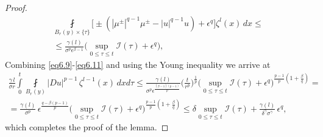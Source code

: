\documentclass[10pt,a4paper]{amsart}
\begin{document}
\begin{proof}
\begin{multline}
\fint\limits_{B_{r}(y)\times\{\tau\}}\big[\pm(|\mu^{\pm}|^{q-1}\mu^{\pm}-|u|^{q-1}u)+\epsilon^q\big]\zeta^l(x)\,dx\leqslant\\\leqslant \frac{\gamma(l)}{\sigma^p \epsilon^{\beta-1}}\big(\sup\limits_{0\leqslant \tau\leqslant t}\mathcal{I}(\tau) +\epsilon^q\big),
\end{multline}
Combining \eqref{eq6.9}-\eqref{eq6.11} and using the Young inequality we arrive at
\begin{multline*}
\frac{\gamma\,l}{\sigma r}\int\limits^t_0\fint\limits_{B_{ r}(y)}|D u|^{p-1}\,\zeta^{l-1}(x)\,dx d\tau\leqslant
\frac{\gamma(l)}{\sigma^p \epsilon^{\frac{(\beta-1)(p-1)}{p}}}\Big(\frac{t}{r^p}\Big)^{\frac{1}{p}}\Big(
\sup\limits_{0\leqslant \tau\leqslant t}\mathcal{I}(\tau)+
\epsilon^q\Big)^{\frac{p-1}{p}(1+\frac{\beta}{q})}=\\=
\frac{\gamma(l)}{\sigma^p}\,\epsilon^{\frac{q-\beta(p-1)}{p}}\Big(
\sup\limits_{0\leqslant \tau\leqslant t}\mathcal{I}(\tau)+
\epsilon^q\Big)^{\frac{p-1}{p}(1+\frac{\beta}{q})}\leqslant \delta \sup\limits_{0\leqslant \tau\leqslant t}\mathcal{I}(\tau)+
\frac{\gamma(l)}{\delta^\gamma \sigma^\gamma}\,\epsilon^q,
\end{multline*}
which completes the proof of the lemma.
\end{proof}
\end{document}
